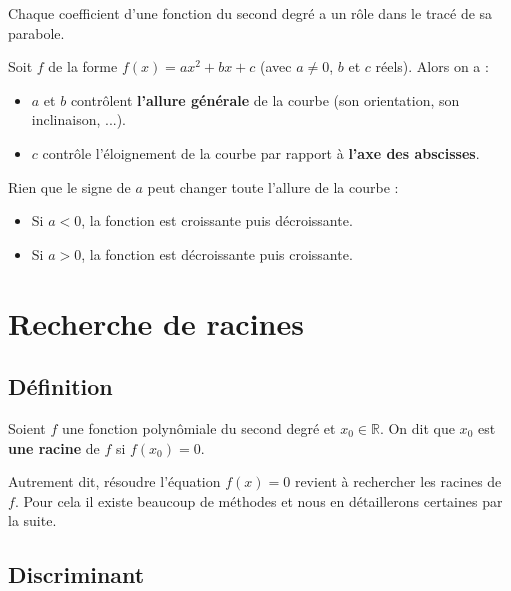 	Chaque coefficient d'une fonction du second degré a un rôle dans le tracé de sa parabole.

	\begin{formula}
		Soit $f$ de la forme $f(x) = ax^2 + bx +c$ (avec $a \neq 0$, $b$ et $c$ réels). Alors on a :
		\begin{itemize}
			\item $a$ et $b$ contrôlent \textbf{l'allure générale} de la courbe (son orientation, son inclinaison, ...).
			\item $c$ contrôle l'éloignement de la courbe par rapport à \textbf{l'axe des abscisses}.
		\end{itemize}
	\end{formula}

	\begin{tip}
		Rien que le signe de $a$ peut changer toute l'allure de la courbe :
		\begin{itemize}
			\item Si $a < 0$, la fonction est croissante puis décroissante.
			\item Si $a > 0$, la fonction est décroissante puis croissante.
		\end{itemize}
	\end{tip}

	\section{Recherche de racines}

	\subsection{Définition}

	\begin{formula}[Définition]
		Soient $f$ une fonction polynômiale du second degré et $x_0 \in \mathbb{R}$. On dit que $x_0$ est \textbf{une racine} de $f$ si $f(x_0) = 0$.
	\end{formula}

	\begin{tip}
		Autrement dit, résoudre l'équation $f(x) = 0$ revient à rechercher les racines de $f$. Pour cela il existe beaucoup de méthodes et nous en détaillerons certaines par la suite.
	\end{tip}

	\subsection{Discriminant}

